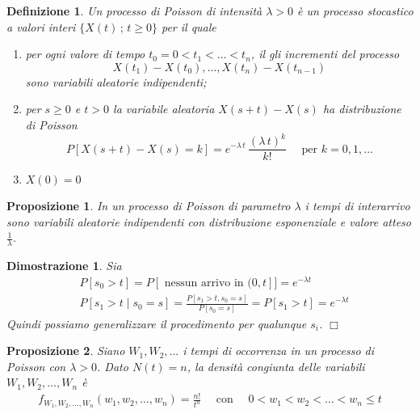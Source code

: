 \documentclass{article}
\newtheorem{definizione}{Definizione}[section]
\newtheorem{proposizione}{Proposizione}[section]
\newtheorem*{dimostrazione*}{Dimostrazione}
\newcommand*{\QED}{\hfill\ensuremath{\Box}}
\begin{document}
\begin{definizione}
Un processo di Poisson di intensità $\lambda > 0$ è un processo stocastico a valori interi $\{X(t)\,;\,t \ge 0\}$ per il quale
\begin{enumerate}
    \item per ogni valore di tempo $t_0 = 0 < t_1 < \hdots < t_n$, il gli incrementi del processo
    $$
    X(t_1) - X(t_0), \hdots, X(t_n) - X(t_{n-1})
    $$
    sono variabili aleatorie indipendenti;
    \item per $s \ge 0$ e $t > 0$ la variabile aleatoria $X(s+t) - X(s)$ ha distribuzione di Poisson
    $$
    P[X(s+t) - X(s) = k] = e^{-\lambda\,t}\,\frac{(\lambda\,t)^k}{k!} \quad \text{ per } k=0,1,\hdots
    $$
    \item $X(0) = 0$
\end{enumerate}
\end{definizione}

\begin{proposizione}
\label{pp_tempi_interarrivo}
In un processo di Poisson di parametro $\lambda$ i tempi di interarrivo sono variabili aleatorie indipendenti con distribuzione esponenziale e valore atteso $\frac{1}{\lambda}$.
\end{proposizione}
\begin{dimostrazione*}
Sia
\begin{align*}
&P[s_0 > t] = P[\text{ nessun arrivo in }(0,t]] = e^{-\lambda t}\\
&P[s_1 > t\mid s_0 = s] = \frac{P[s_1 > t, s_0 = s]}{P[s_0 = s]} = P[s_1 > t] = e^{-\lambda t}
\end{align*}
Quindi possiamo generalizzare il procedimento per qualunque $s_i$. 
\QED
\end{dimostrazione*}

\begin{proposizione}
\label{pp_dens_congiunta_variabili}
Siano $W_1,W_2,\hdots$ i tempi di occorrenza in un processo di Poisson con $\lambda > 0$. Dato $N(t) =n$, la densità congiunta delle variabili $W_1,W_2,\hdots,W_n$ è
\begin{align*}
f_{W_1,W_2,...,W_n}(w_1,w_2,\hdots,w_n) = \frac{n!}{t^n}\quad\text{ con }\quad 0<w_1<w_2<\hdots<w_n\le t
\end{align*}
\end{proposizione}
\end{document}
